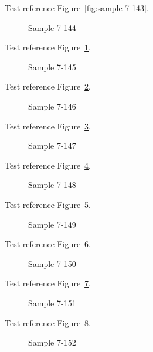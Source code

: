 Test reference Figure~\ref{fig:sample-7-143}.

\begin{figure}[tbhp]
\caption{Sample 7-144}
\label{fig:sample-7-144}
\end{figure}

Test reference Figure~\ref{fig:sample-7-144}.

\begin{figure}[tbhp]
\caption{Sample 7-145}
\label{fig:sample-7-145}
\end{figure}

Test reference Figure~\ref{fig:sample-7-145}.

\begin{figure}[tbhp]
\caption{Sample 7-146}
\label{fig:sample-7-146}
\end{figure}

Test reference Figure~\ref{fig:sample-7-146}.

\begin{figure}[tbhp]
\caption{Sample 7-147}
\label{fig:sample-7-147}
\end{figure}

Test reference Figure~\ref{fig:sample-7-147}.

\begin{figure}[tbhp]
\caption{Sample 7-148}
\label{fig:sample-7-148}
\end{figure}

Test reference Figure~\ref{fig:sample-7-148}.

\begin{figure}[tbhp]
\caption{Sample 7-149}
\label{fig:sample-7-149}
\end{figure}

Test reference Figure~\ref{fig:sample-7-149}.

\begin{figure}[tbhp]
\caption{Sample 7-150}
\label{fig:sample-7-150}
\end{figure}

Test reference Figure~\ref{fig:sample-7-150}.

\begin{figure}[tbhp]
\caption{Sample 7-151}
\label{fig:sample-7-151}
\end{figure}

Test reference Figure~\ref{fig:sample-7-151}.

\begin{figure}[tbhp]
\caption{Sample 7-152}
\label{fig:sample-7-152}
\end{figure}

